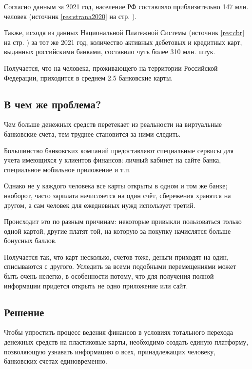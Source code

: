 \documentclass[a4paper,12pt]{article}
\begin{document}
    Согласно данным за 2021 год, население РФ составляло приблизительно 147 млн. человек (источник \ref{res:strana2020} на стр. \pageref{res:strana2020}).

    Также, исходя из данных Национальной Платежной Системы (источник
    \ref{res:cbr} на стр. \pageref{res:cbr}) за тот же 2021 год,
    количество активных дебетовых и кредитных карт, выданных
    российскими банками, составило чуть более 310 млн. штук.

    Получается, что на человека, проживающего
    на территории Российской Федерации, приходится в среднем
    2.5 банковские карты.

    \subsection{В чем же проблема?}

    Чем больше денежных средств перетекает из реальности
    на виртуальные банковские счета, тем труднее становится за
    ними следить.

    Большинство банковских компаний предоставляют
    специальные сервисы для учета имеющихся у
    клиентов финансов: личный кабинет на сайте банка, специальное
    мобильное приложение и т.п.

    Однако не у каждого человека все карты открыты в одном и том
    же банке; наоборот, часто зарплата начисляется на один счёт,
    сбережения хранятся на другом, а сам человек для ежедневных
    нужд использует третий.

    Происходит это по разным причинам: некоторые привыкли
    пользоваться только одной картой, другие платят той, на которую
    за покупку начислятся больше бонусных баллов.

    Получается так, что карт несколько, счетов тоже,
    деньги приходят на один, списываются с другого. Уследить за
    всеми подобными перемещениями может быть очень нелегко, в
    особенности потому, что для получения полной информации
    придется открыть не одно приложение или сайт.

    \subsection{Решение}

    Чтобы упростить процесс ведения финансов в условиях тотального
    перехода денежных средств на пластиковые карты, необходимо
    создать единую платформу, позволяющую узнавать информацию
    о всех, принадлежащих человеку, банковских счетах единовременно.
\end{document}
